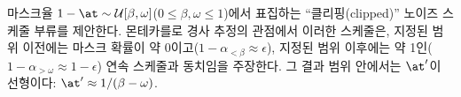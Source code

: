 \documentclass{article} %
\newcommand{\vkl}[1]{\textcolor{blue}{[VK: #1]}}
\newcommand{\TODO}[1]{\textcolor{red}{[TODO: #1]}}
\begin{document}
마스크율 $1-\at \sim \mathcal{U}[\beta, \omega]$($0 \leq \beta, \omega \leq 1$)에서 표집하는 ``클리핑(clipped)'' 노이즈 스케줄 부류를 제안한다. 몬테카를로 경사 추정의 관점에서 이러한 스케줄은, 지정된 범위 이전에는 마스크 확률이 약 0이고($1-\alpha_{<\beta} \approx \epsilon$), 지정된 범위 이후에는 약 1인($1-\alpha_{>\omega} \approx 1-\epsilon$) 연속 스케줄과 동치임을 주장한다. 그 결과 범위 안에서는 $\at'$이 선형이다: $\at' \approx 1 / (\beta - \omega)$.



\end{document}
